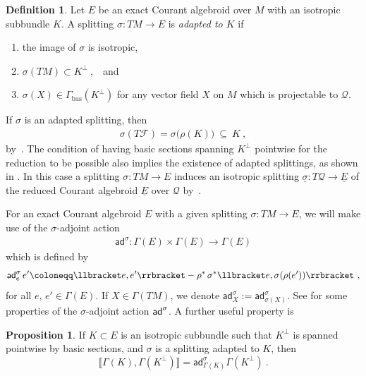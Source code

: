 \documentclass[a4paper, reqno, 11pt]{amsart}
\numberwithin{equation}{section}
\theoremstyle{definition}
\newtheorem{definition}[equation]{Definition}
\newtheorem{proposition}[equation]{Proposition}
\newcommand{\sfgamma}{\mathsf{\Gamma}}
\newcommand{\cbrak}[1]{\llbracket #1 \rrbracket}
\newcommand{\red}[1]{\underline{#1}}
\newcommand{\cQ}{{\mathcal Q}}
\newcommand{\cF}{{\mathcal F}}
\newcommand{\sfGamma}{{\mathsf{\Gamma}}}
\newcommand{\ad}{\mathsf{ad}}
\theoremstyle{remark}
\begin{document}
\begin{definition}\label{defn:adaptedsplittings}
Let $E$ be an exact Courant algebroid over $M$ with an isotropic subbundle $K$. A splitting $\sigma \colon  TM \to E$ is \emph{adapted to $K$} if
\begin{enumerate}[label= (\alph{enumi}), labelwidth=0pt]
\item the image of $\sigma$ is isotropic,\\[-3mm]
\item $\sigma(TM)\subset K^\perp \ ,$ \  and \\[-3mm]
\item $\sigma(X)\in \mathsf{\Gamma}_{\mathrm{bas}}(K^\perp)$ for any vector field $X$ on $M$ which is projectable to $\cQ$.
\end{enumerate} 
\end{definition}

If $\sigma$ is an adapted splitting, then
\begin{align}
    \sigma(T\cF) = \sigma\big(\rho(K)\big) \ \subseteq \ K \ ,
\end{align}
by~\cite[Remark~5.2]{Zambon2008reduction}.
The condition of having basic sections spanning $K^\perp$ pointwise for the reduction to be possible also implies the existence of adapted splittings, as shown in \cite[Proposition 5.5]{Zambon2008reduction}. 
In this case a splitting $\sigma:TM\to E$ induces an isotropic splitting $\red\sigma:T\cQ\to\red E$ of the reduced Courant algebroid $\red E$ over $\cQ$ by~\cite[Proposition~5.7]{Zambon2008reduction}.

For an exact Courant algebroid $E$ with a given splitting $\sigma \colon TM\to E$, we will make use of the $\sigma$-adjoint action~\cite[Definition~5.21]{DeFraja:2023fhe}
\begin{align} 
\ad^\sigma:\sfgamma(E)\times\sfgamma(E)\longrightarrow\sfgamma(E)
\end{align}
which is defined by
\begin{align} \label{eqn:sigmatwistact}
    {\sf ad}^\sigma_e\, e' \coloneqq \llbracket e , e' \rrbracket - \rho^*\,{\sigma}^*\llbracket e , {\sigma}(\rho(e')) \rrbracket \ ,
\end{align}
for all $e, \, e' \in \sfgamma(E).$ If $X\in\sfGamma(TM)$, we denote $\mathsf{ad}_X^\sigma := \mathsf{ad}_{\sigma(X)}^\sigma$.
See \cite[Appendix A]{deFraja2025Ricci} for some properties of the $\sigma$-adjoint action ${\sf ad}^\sigma$. A further useful property is

\begin{proposition}\label{prop:adaptedsplittingadaction}
     If $K\subset E$ is an isotropic subbundle such that $K^\perp$ is spanned pointwise by basic sections, and $\sigma$ is a splitting adapted to $K$, then $$\cbrak{\sfgamma(K), \sfgamma(K^\perp)} = \ad^\sigma_{\sfgamma(K)} \sfgamma(K^\perp) \ . $$
\end{proposition}
\end{document}
